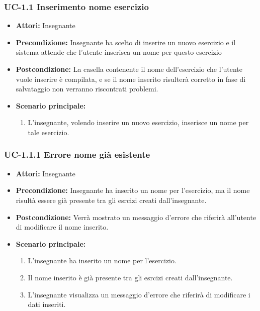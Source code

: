 \subsubsection{UC-1.1 Inserimento nome esercizio}
\begin{itemize}
\item \textbf{Attori: }Insegnante

\item \textbf{Precondizione: }Insegnante ha scelto di inserire un nuovo esercizio e il sistema attende che l'utente inserisca un nome per questo esercizio
\item \textbf{Postcondizione: }La casella contenente il nome dell'esercizio che l'utente vuole inserire è compilata, e se il nome inserito risulterà corretto in fase di salvataggio non verranno riscontrati problemi.
\item \textbf{Scenario principale: }
		\begin{enumerate}
		\item L'insegnante, volendo inserire un nuovo esercizio, inserisce un nome per tale esercizio.
		\end{enumerate}
		
\end{itemize}
\subsubsection{UC-1.1.1 Errore nome già esistente}
\begin{itemize}
\item \textbf{Attori: }Insegnante

\item \textbf{Precondizione: }Insegnante ha inserito un nome per l'esercizio, ma il nome risultà essere già presente tra gli esrcizi creati dall'insegnante.
\item \textbf{Postcondizione: }Verrà mostrato un messaggio d'errore che riferirà all'utente di modificare il nome inserito.
\item \textbf{Scenario principale: }
		\begin{enumerate}
		\item L'insegnante ha inserito un nome per l'esercizio.
		\item Il nome inserito è già presente tra gli esrcizi creati dall'insegnante.
		\item L'insegnante visualizza un messaggio d'errore che riferirà di modificare i dati inseriti.
		\end{enumerate}
		
\end{itemize}
